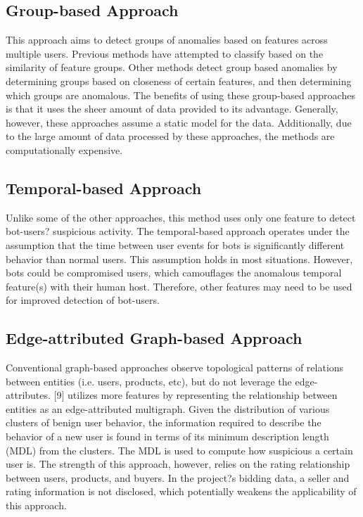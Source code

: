 \documentclass{article} %
\begin{document}
\subsection{Group-based Approach}

This approach aims to detect groups of anomalies based on features across multiple users.
Previous methods have attempted to classify based on the similarity of feature groups. %
Other methods detect group based anomalies by determining groups based on closeness of certain features, and then determining which groups are anomalous. %
The benefits of using these group-based approaches is that it uses the sheer amount of data provided to its advantage.
Generally, however, these approaches assume a static model for the data.
Additionally, due to the large amount of data processed by these approaches, the methods are computationally expensive.

\subsection{Temporal-based Approach}

Unlike some of the other approaches, this method uses only one feature to detect bot-users? suspicious activity.
The temporal-based approach operates under the assumption that the time between user events for bots is significantly different behavior than normal users. %
This assumption holds in most situations.
However, bots could be compromised users, which camouflages the anomalous temporal feature(s) with their human host.
Therefore, other features may need to be used for improved detection of bot-users.

\subsection{Edge-attributed Graph-based Approach}

Conventional graph-based approaches observe topological patterns of relations between entities (i.e. users, products, etc), but do not leverage the edge-attributes.
[9] utilizes more features by representing the relationship between entities as an edge-attributed multigraph. %
Given the distribution of various clusters of benign user behavior, the information required to describe the behavior of a new user is found in terms of its minimum description length (MDL) from the clusters.
The MDL is used to compute how suspicious a certain user is.
The strength of this approach, however, relies on the rating relationship between users, products, and buyers.
In the project?s bidding data, a seller and rating information is not disclosed, which potentially weakens the applicability of this approach.
\end{document}

